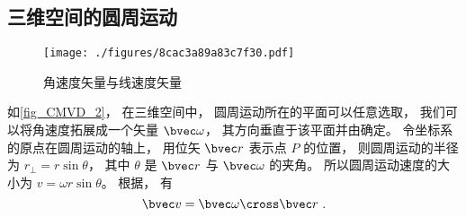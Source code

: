 \subsection{三维空间的圆周运动}\label{sub_CMVD_1}

\begin{figure}[ht]
\centering
\texttt{[image: ./figures/8cac3a89a83c7f30.pdf]}
\caption{角速度矢量与线速度矢量} \label{fig_CMVD_2}
\end{figure}

如\autoref{fig_CMVD_2}， 在三维空间中， 圆周运动所在的平面可以任意选取， 我们可以将角速度拓展成一个矢量 $\bvec\omega$， 其方向垂直于该平面并由确定。 令坐标系的原点在圆周运动的轴上， 用位矢 $\bvec r$ 表示点 $P$ 的位置， 则圆周运动的半径为 $r_\bot = r \sin\theta$， 其中 $\theta$ 是 $\bvec r$ 与 $\bvec \omega$ 的夹角。 所以圆周运动速度的大小为 $v = \omega r \sin\theta$。 根据， 有
\begin{equation}\label{eq_CMVD_5}
\bvec v = \bvec\omega \cross \bvec r~.
\end{equation}
